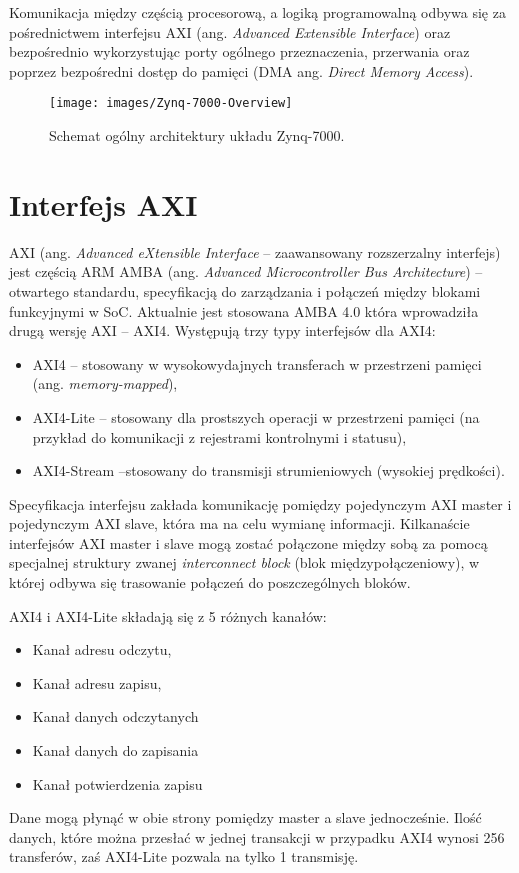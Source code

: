 Komunikacja między częścią procesorową, a logiką programowalną odbywa się za pośrednictwem interfejsu AXI (ang. \textit{Advanced Extensible Interface}) oraz bezpośrednio wykorzystując porty ogólnego przeznaczenia, przerwania oraz poprzez bezpośredni dostęp do pamięci (DMA ang. \textit{Direct Memory Access}).

\begin{figure}[h]
    \centering
    \texttt{[image: images/Zynq-7000-Overview]}
    \caption{Schemat ogólny architektury układu Zynq-7000.}
    \label{fig:zynq7000}
\end{figure}

\section{Interfejs AXI}
 AXI (ang. \textit{Advanced eXtensible Interface} --  zaawansowany rozszerzalny interfejs) jest częścią ARM AMBA (ang.\textit{ Advanced Microcontroller Bus Architecture}) -- otwartego standardu, specyfikacją do zarządzania i połączeń między blokami funkcyjnymi w SoC. %
 Aktualnie jest stosowana AMBA 4.0 która wprowadziła drugą wersję AXI -- AXI4. 
 Występują trzy typy interfejsów dla AXI4:
\begin{itemize}
\item AXI4 -- stosowany w wysokowydajnych transferach w przestrzeni pamięci (ang. \textit{memory-mapped}),
\item AXI4-Lite -- stosowany dla prostszych operacji w przestrzeni pamięci (na przykład do komunikacji z rejestrami kontrolnymi i statusu),
\item AXI4-Stream --stosowany do transmisji strumieniowych (wysokiej prędkości). 
\end{itemize}
Specyfikacja interfejsu zakłada komunikację pomiędzy pojedynczym AXI master i pojedynczym AXI slave, która ma na celu wymianę informacji. 
Kilkanaście interfejsów AXI master i slave mogą zostać połączone między sobą za pomocą specjalnej struktury zwanej \textit{interconnect block} (blok międzypołączeniowy), w której odbywa się trasowanie połączeń do poszczególnych bloków. 

AXI4 i AXI4-Lite składają się z 5 różnych kanałów:
\begin{itemize}
\item Kanał adresu odczytu,
\item Kanał adresu zapisu,
\item Kanał danych odczytanych
\item Kanał danych do zapisania
\item Kanał potwierdzenia zapisu
\end{itemize}
Dane mogą płynąć w obie strony pomiędzy master a slave jednocześnie.
Ilość danych, które można przesłać w jednej transakcji w przypadku AXI4 wynosi 256 transferów, zaś AXI4-Lite pozwala na tylko 1 transmisję.


